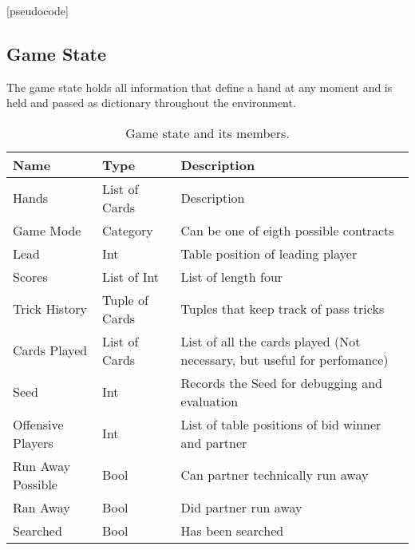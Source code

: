 [pseudocode]
\subsection{Game State}
The game state holds all information that define a hand at any moment and is held and passed as dictionary throughout
the environment.
\newline
\begin{table}[h!]
\begin{tabular}{lll}
Name              & Type           & Description                                                             \\
\hline
Hands             & List of Cards  & Description                                                             \\
Game Mode         & Category       & Can be one of eigth possible contracts                                  \\
Lead              & Int            & Table position of leading player                                        \\
Scores            & List of Int    & List of length four                                                     \\
Trick History     & Tuple of Cards & Tuples that keep track of pass tricks                                   \\
Cards Played      & List of Cards  & List of all the cards played (Not necessary, but useful for perfomance) \\
Seed              & Int            & Records the Seed for debugging and evaluation                           \\
Offensive Players & Int            & List of table positions of bid winner and partner                       \\
Run Away Possible & Bool           & Can partner technically run away                                        \\
Ran Away          & Bool           & Did partner run away                                                    \\
Searched          & Bool           & Has been searched
\end{tabular}
\caption{Game state and its members.}
\label{tab:gamestate}
\end{table}

